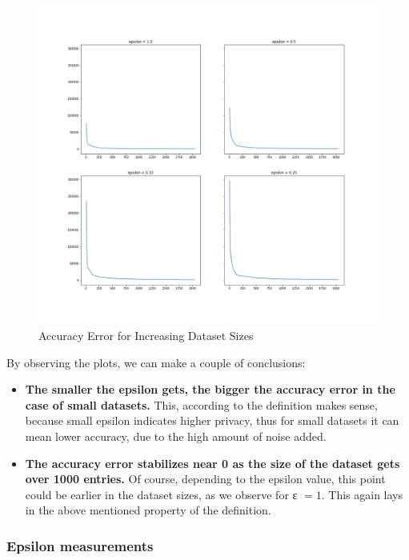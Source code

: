 \begin{figure}[!htb]\centering
    \includegraphics[width=1\textwidth]{images/increasing_ds_size.png}
    \caption{Accuracy Error for Increasing Dataset Sizes}
\end{figure}


By observing the plots, we can make a couple of conclusions:

\begin{itemize}
    \item \textbf{The smaller the epsilon gets, the bigger the accuracy error in the case of small datasets.} This, according to the definition makes sense, because small epsilon indicates higher privacy, thus for small datasets it can mean lower accuracy, due to the high amount of noise added.
    \item \textbf{The accuracy error stabilizes near 0 as the size of the dataset gets over 1000 entries.} Of course, depending to the epsilon value, this point could be earlier in the dataset sizes, as we observe for ε $= 1$. This again lays in the above mentioned property of the definition.
\end{itemize}

\subsubsection{Epsilon measurements}

